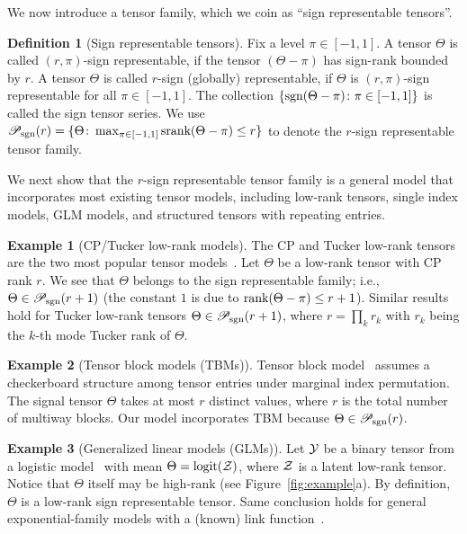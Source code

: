 \documentclass{article}
\theoremstyle{plain}
\theoremstyle{definition}
\newtheorem{defn}{Definition}
\newtheorem{example}{Example}
\def\sign{\textup{sgn}}
\def\srank{\textup{srank}}
\def\rank{\textup{rank}}
\def\caliP{\mathscr{P}_{\textup{sgn}}}
\begin{document}
We now introduce a tensor family, which we coin as ``sign representable tensors''.
\vspace{.05cm}
\begin{defn}[Sign representable tensors] 
Fix a level $\pi\in[-1,1]$. A tensor $\Theta$ is called $(r,\pi)$-sign representable, if the tensor $(\Theta-\pi)$ has sign-rank bounded by $r$. A tensor $\Theta$ is called $r$-sign (globally) representable, if $\Theta$ is $(r,\pi)$-sign representable for all $\pi\in[-1,1]$. The collection $\{\sign(\Theta-\pi)\colon \pi \in[-1,1]\}$ is called the sign tensor series. 
We use $\caliP(r)=\{\Theta\colon \max_{\pi\in[-1,1]}\srank(\Theta-\pi)\leq r\}$ to denote the $r$-sign representable tensor family.
\end{defn}

We next show that the $r$-sign representable tensor family is a general model that incorporates most existing tensor models, including low-rank tensors, single index models, GLM models, and structured tensors with repeating entries. 

\vspace{.05cm}
\begin{example}[CP/Tucker low-rank models] The CP and Tucker low-rank tensors are the two most popular tensor models~\citep{kolda2009tensor}. Let $\Theta$ be a low-rank tensor with CP rank $r$. We see that $\Theta$ belongs to the sign representable family; i.e., $\Theta\in\caliP(r+1)$ (the constant $1$ is due to $\rank(\Theta-\pi)\leq r+1$). Similar results hold for Tucker low-rank tensors $\Theta\in\caliP(r+1)$, where $r=\prod_kr_k$ with $r_k$ being the $k$-th mode Tucker rank of $\Theta$.  
\end{example} 
\vspace{.05cm}

\begin{example}[Tensor block models (TBMs)] Tensor block model~\citep{wang2019multiway,chi2020provable} assumes a checkerboard structure among tensor entries under marginal index permutation. The signal tensor $\Theta$ takes at most $r$ distinct values, where $r$ is the total number of multiway blocks. Our model incorporates TBM because $\Theta \in \caliP(r)$. 
\end{example}
\vspace{.05cm}

\begin{example}[Generalized linear models (GLMs)] Let $\mathcal{Y}$ be a binary tensor from a logistic model~\citep{wang2018learning} with mean $\Theta=\text{logit}(\mathcal{Z})$, where $\mathcal{Z}$ is a latent low-rank tensor. Notice that $\Theta$ itself may be high-rank (see Figure~\ref{fig:example}a). By definition, $\Theta$ is a low-rank sign representable tensor. Same conclusion holds for general exponential-family models with a (known) link function~\citep{hong2020generalized}. 
\end{example}
\vspace{.05cm}
\end{document}
